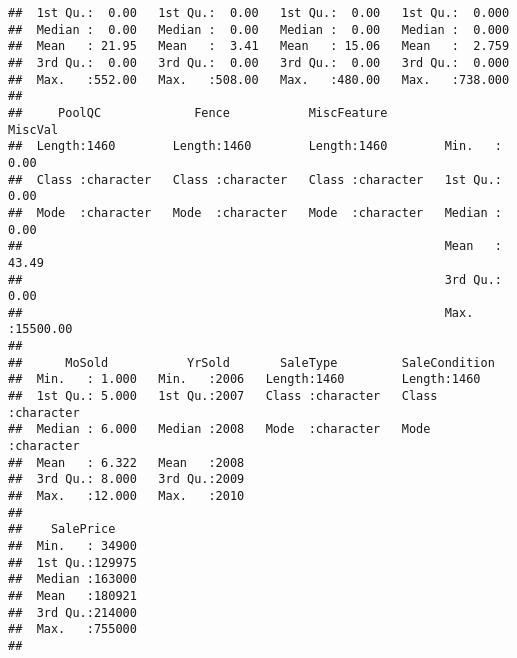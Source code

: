 \documentclass[
]{article}
\begin{document}
\begin{verbatim}
##  1st Qu.:  0.00   1st Qu.:  0.00   1st Qu.:  0.00   1st Qu.:  0.000  
##  Median :  0.00   Median :  0.00   Median :  0.00   Median :  0.000  
##  Mean   : 21.95   Mean   :  3.41   Mean   : 15.06   Mean   :  2.759  
##  3rd Qu.:  0.00   3rd Qu.:  0.00   3rd Qu.:  0.00   3rd Qu.:  0.000  
##  Max.   :552.00   Max.   :508.00   Max.   :480.00   Max.   :738.000  
##                                                                      
##     PoolQC             Fence           MiscFeature           MiscVal        
##  Length:1460        Length:1460        Length:1460        Min.   :    0.00  
##  Class :character   Class :character   Class :character   1st Qu.:    0.00  
##  Mode  :character   Mode  :character   Mode  :character   Median :    0.00  
##                                                           Mean   :   43.49  
##                                                           3rd Qu.:    0.00  
##                                                           Max.   :15500.00  
##                                                                             
##      MoSold           YrSold       SaleType         SaleCondition     
##  Min.   : 1.000   Min.   :2006   Length:1460        Length:1460       
##  1st Qu.: 5.000   1st Qu.:2007   Class :character   Class :character  
##  Median : 6.000   Median :2008   Mode  :character   Mode  :character  
##  Mean   : 6.322   Mean   :2008                                        
##  3rd Qu.: 8.000   3rd Qu.:2009                                        
##  Max.   :12.000   Max.   :2010                                        
##                                                                       
##    SalePrice     
##  Min.   : 34900  
##  1st Qu.:129975  
##  Median :163000  
##  Mean   :180921  
##  3rd Qu.:214000  
##  Max.   :755000  
## 
\end{verbatim}
\end{document}

